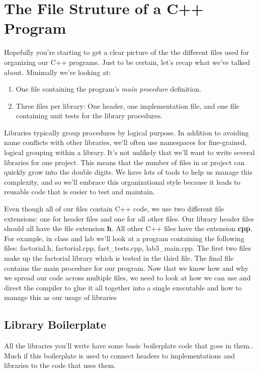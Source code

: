 \documentclass[]{tufte-handout}
\begin{document}
\section{The File Struture of a C++ Program}

Hopefully you're starting to get a clear picture of the the different files used for organizing our C++ programs. Just to be certain, let's recap what we've talked about. Minimally we're looking at: 
\begin{enumerate}
\item One file containing the program's \textit{main procedure} definition.
\item Three files per library: One header, one implementation file, and one file containing unit tests for the library procedures.
\end{enumerate}
Libraries typically group procedures by logical purpose. In addition to avoiding name conflicts with other libraries, we'll often use namespaces for fine-grained, logical grouping within a library. It's not unlikely that we'll want to write several libraries for one project. This means that the number of files in or project can quickly grow into the double digits. We have lots of tools to help us manage this complexity, and so we'll embrace this organizational style because it leads to reusable code that is easier to test and maintain.

Even though all of our files contain C++ code, we use two different file extensions: one for header files and one for all other files. Our library header files should all have the file extension \textbf{h}. All other C++ files have the extension \textbf{cpp}.  For example, in class and lab we'll look at a program containing the following files: factorial.h, factorial.cpp, fact\_tests.cpp, lab3\_main.cpp.  The first two files make up the factorial library which is tested in the third file. The final file contains the main procedure for our program. Now that we know how and why we spread our code across multiple files, we need to look at how we can use and direct the compiler to glue it all together into a single executable and how to manage this as our usage of libraries 

\subsection{Library Boilerplate} 

All the libraries you'll write have some basic boilerplate code that goes in them.. Much if this boilerplate is used to connect headers to implementations and libraries to the code that uses them. 
\end{document}

